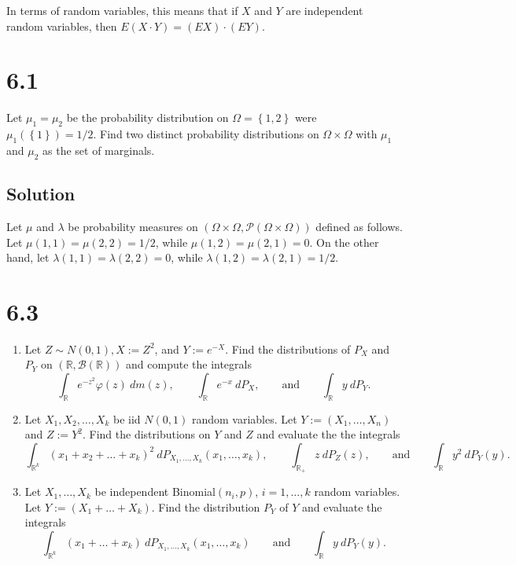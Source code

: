 \documentclass[12pt]{article}
\begin{document}
In terms of random variables, this means that if $X$ and $Y$ are independent random variables, then $E(X\cdot Y) = (EX)\cdot(EY)$.







\newpage 
\section*{6.1}
Let $\mu_{1} = \mu_{2}$ be the probability distribution on $\Omega = \left\{ 1,2 \right\}$ were $\mu_{1}(\left\{ 1 \right\}) = 1/2$. Find two distinct
probability distributions on $\Omega \times \Omega$ with $\mu_{1}$ and $\mu_{2}$ as the set of marginals.

\subsection*{Solution}
Let $\mu$ and $\lambda$ be probability measures on $(\Omega \times \Omega, \mathcal{P}(\Omega\times \Omega))$ defined as follows. 
Let $\mu(1,1) = \mu(2,2) = 1/2$, while $\mu(1,2) = \mu(2,1) = 0$. On the other hand, let $\lambda(1,1) = \lambda(2,2) = 0$, while $\lambda(1,2) =
\lambda(2,1) = 1/2$.






\newpage 
\section*{6.3}
\begin{enumerate}[label=(\alph*)]
\item Let $Z \sim N(0,1), X := Z^{2}$, and $Y := e^{-X}$. Find the distributions of $P_{X}$ and $P_{Y}$ on $(\mathbb{R}, \mathcal{B}(\mathbb{R}))$ and
compute the integrals
\[ \int_{\mathbb{R}}e^{-z^{2}}\varphi(z)\ dm(z), \qquad \int_{\mathbb{R}}e^{-x}\ dP_{X}, \qquad \text{and} \qquad \int_{\mathbb{R}}y\ dP_{Y}. \]
\item Let $X_{1}, X_{2}, \hdots, X_{k}$ be iid $N(0,1)$ random variables. Let $Y := (X_{1}, \dots, X_{n})$ and $Z := Y^{2}$. Find the distributions
on $Y$ and $Z$ and evaluate the the integrals
\[ \int_{\mathbb{R}^{k}}(x_{1} + x_{2} + \dots + x_{k})^{2}\ dP_{X_{1},\hdots,X_{k}}(x_{1},\hdots,x_{k}), \qquad \int_{\mathbb{R}_{+}}z\ dP_{Z}(z),
\qquad\text{and}\qquad \int_{\mathbb{R}}y^{2}\ dP_{Y}(y).  \]
\item Let $X_{1}, \hdots, X_{k}$ be independent Binomial$(n_{i}, p)$, $i = 1, \hdots, k$ random variables. Let $Y := (X_{1} + \dots + X_{k})$. Find
the distribution $P_{Y}$ of $Y$ and evaluate the integrals 
\[ \int_{\mathbb{R}^{k}}(x_{1} + \dots + x_{k})\ dP_{X_{1},\hdots,X_{k}}(x_{1},\hdots,x_{k}) \qquad \text{and} \qquad \int_{\mathbb{R}}y\ dP_{Y}(y). \]
\end{enumerate}
\end{document}
